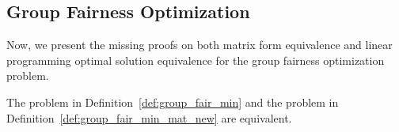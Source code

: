 \subsection{Group Fairness Optimization}\label{sec:fair_optim_append}

Now, we present the missing proofs on both matrix form equivalence and linear programming optimal solution equivalence for the group fairness optimization problem. 

\begin{proposition}\label{lem:group_fair_min_equiv_append}
    The problem in Definition~\ref{def:group_fair_min} and the problem in Definition~\ref{def:group_fair_min_mat_new} are equivalent.
\end{proposition}
